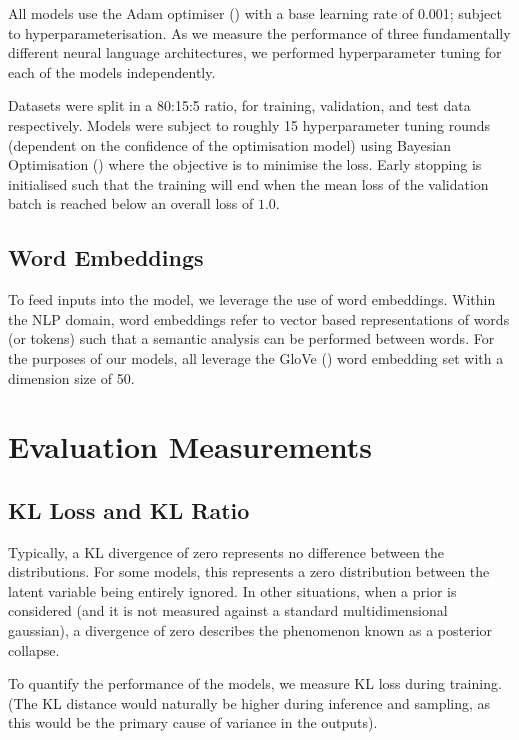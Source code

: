\documentclass[12pt,twoside]{report}
\begin{document}
All models use the Adam optimiser (\cite{kingma_adam:_2014}) with a base learning rate of 0.001; subject to hyperparameterisation. As we measure the performance of three fundamentally different neural language architectures, we performed hyperparameter tuning for each of the models independently.

Datasets were split in a 80:15:5 ratio, for training, validation, and test data respectively. Models were subject to roughly 15 hyperparameter tuning rounds (dependent on the confidence of the optimisation model) using Bayesian Optimisation (\cite{gpyopt_authors_gpyopt:_2016}) where the objective is to minimise the loss. Early stopping is initialised such that the training will end when the mean loss of the validation batch is reached below an overall loss of $1.0$. 

\subsection{Word Embeddings}
\label{word_embeddings}

To feed inputs into the model, we leverage the use of word embeddings. Within the NLP domain, word embeddings refer to vector based representations of words (or tokens) such that a semantic analysis can be performed between words. For the purposes of our models, all leverage the GloVe (\cite{pennington_glove:_2014}) word embedding set with a dimension size of 50.

\section{Evaluation Measurements}

\subsection{KL Loss and KL Ratio}

Typically, a KL divergence of zero represents no difference between the distributions. For some models, this represents a zero distribution between the latent variable being entirely ignored. In other situations, when a prior is considered (and it is not measured against a standard multidimensional gaussian), a divergence of zero describes the phenomenon known as a posterior collapse.

To quantify the performance of the models, we measure KL loss during training. (The KL distance would naturally be higher during inference and sampling, as this would be the primary cause of variance in the outputs).
\end{document}
